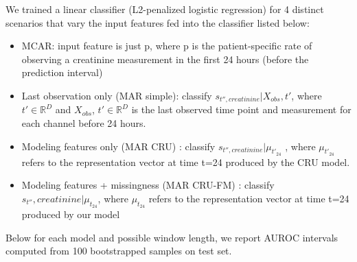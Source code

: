 We trained a linear classifier (L2-penalized logistic regression) for 4 distinct scenarios that vary the input features fed into the classifier listed below:
\begin{itemize}
\item MCAR: input feature is just p, where p  is the patient-specific rate of observing a creatinine measurement in the first 24 hours (before the prediction interval)

\item Last observation only (MAR simple): classify $s_{t'', creatinine}|X_{obs},t'$, where $t'\in \mathbb{R}^D$ and $X_{obs}$, $t'\in \mathbb{R}^D$ is the last observed time point and measurement for each channel before 24 hours.

\item Modeling features only (MAR CRU) : classify $s_{t'', creatinine}|\mu_{t'_{24}}$ , where $\mu_{t'_{24}}$ refers to the representation vector  at time t=24 produced by the CRU model.

\item Modeling features + missingness (MAR CRU-FM) : classify $s_{t''}, creatinine|\mu_{t_{24}}$, where $\mu_{t_{24}}$ refers to the representation vector  at time t=24 produced by our model
\end{itemize}

Below for each model and possible window length, we report AUROC intervals computed from 100 bootstrapped samples on test set. %

